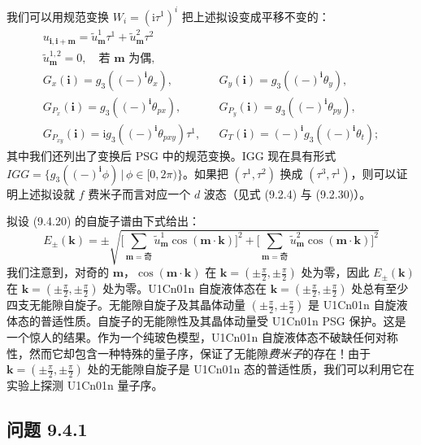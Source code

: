 我们可以用规范变换 $W_{i}=(\mathrm{i}\tau^{1})^{i}$ 把上述拟设变成平移不变的：
\begin{equation*}
\begin{array}{rcl}
u_{\pmb{i},\pmb{i}+\pmb{m}}=\tilde{u}_{\pmb{m}}^{1}\tau^{1}+\tilde{u}_{\pmb{m}}^{2}\tau^{2} & & \\[2pt]
\tilde{u}_{\pmb{m}}^{1,2}=0,\quad \text{若 }\pmb{m}\text{ 为偶}, & & \\[2pt]
G_{x}(\pmb{i})=g_{3}((-)^{\pmb{i}}\theta_{x}), & & G_{y}(\pmb{i})=g_{3}((-)^{\pmb{i}}\theta_{y}),\\[2pt]
G_{P_{x}}(\pmb{i})=g_{3}((-)^{\pmb{i}}\theta_{px}), & & G_{P_{y}}(\pmb{i})=g_{3}((-)^{\pmb{i}}\theta_{py}),\\[2pt]
G_{P_{xy}}(\pmb{i})=\mathrm{i}g_{3}((-)^{\pmb{i}}\theta_{pxy})\tau^{1}, & & G_{T}(\pmb{i})=(-)^{\pmb{i}}g_{3}((-)^{\pmb{i}}\theta_{t});
\end{array}
\tag{9.4.20}
\end{equation*}
其中我们还列出了变换后 PSG 中的规范变换。IGG 现在具有形式 $IGG=\{g_{3}((-)^{\pmb{i}}\phi)\,|\,\phi\in[0,2\pi)\}$。如果把 $(\tau^{1},\tau^{2})$ 换成 $(\tau^{3},\tau^{1})$，则可以证明上述拟设就 $f$ 费米子而言对应一个 $d$ 波态（见式 (9.2.4) 与 (9.2.30)）。

拟设 (9.4.20) 的自旋子谱由下式给出：
\begin{equation*}
E_{\pm}(\pmb{k})=\pm\sqrt{\Bigg[\sum_{\pmb{m}=\text{奇}}\tilde{u}_{\pmb{m}}^{1}\cos(\pmb{m}\cdot\pmb{k})\Bigg]^{2}+\Bigg[\sum_{\pmb{m}=\text{奇}}\tilde{u}_{\pmb{m}}^{2}\cos(\pmb{m}\cdot\pmb{k})\Bigg]^{2}}
\end{equation*}
我们注意到，对奇的 $\pmb{m}$，$\cos(\pmb{m}\cdot\pmb{k})$ 在 $\pmb{k}=(\pm\frac{\pi}{2},\pm\frac{\pi}{2})$ 处为零，因此 $E_{\pm}(\pmb{k})$ 在 $\pmb{k}=(\pm\frac{\pi}{2},\pm\frac{\pi}{2})$ 处为零。U1Cn01n 自旋液体态在 $\pmb{k}=(\pm\frac{\pi}{2},\pm\frac{\pi}{2})$ 处总有至少四支无能隙自旋子。无能隙自旋子及其晶体动量 $(\pm\frac{\pi}{2},\pm\frac{\pi}{2})$ 是 U1Cn01n 自旋液体态的普适性质。自旋子的无能隙性及其晶体动量受 U1Cn01n PSG 保护。这是一个惊人的结果。作为一个纯玻色模型，U1Cn01n 自旋液体态不破缺任何对称性，然而它却包含一种特殊的量子序，保证了无能隙\emph{费米子}的存在！由于 $\pmb{k}=(\pm\frac{\pi}{2},\pm\frac{\pi}{2})$ 处的无能隙自旋子是 U1Cn01n 态的普适性质，我们可以利用它在实验上探测 U1Cn01n 量子序。

\subsection*{问题 9.4.1}

